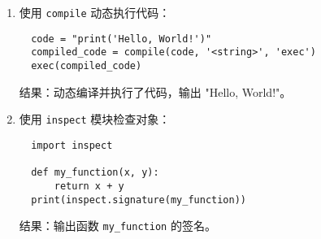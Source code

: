 \documentclass[UTF8]{ctexart}
\begin{document}
\begin{enumerate}
  \item 使用 \texttt{compile} 动态执行代码：
  \begin{verbatim}
  code = "print('Hello, World!')"
  compiled_code = compile(code, '<string>', 'exec')
  exec(compiled_code)
  \end{verbatim}
  结果：动态编译并执行了代码，输出 "Hello, World!"。
  
  \item 使用 \texttt{inspect} 模块检查对象：
  \begin{verbatim}
  import inspect

  def my_function(x, y):
      return x + y
  print(inspect.signature(my_function))
  \end{verbatim}
  结果：输出函数 \texttt{my\_function} 的签名。
\end{enumerate}
\end{document}
